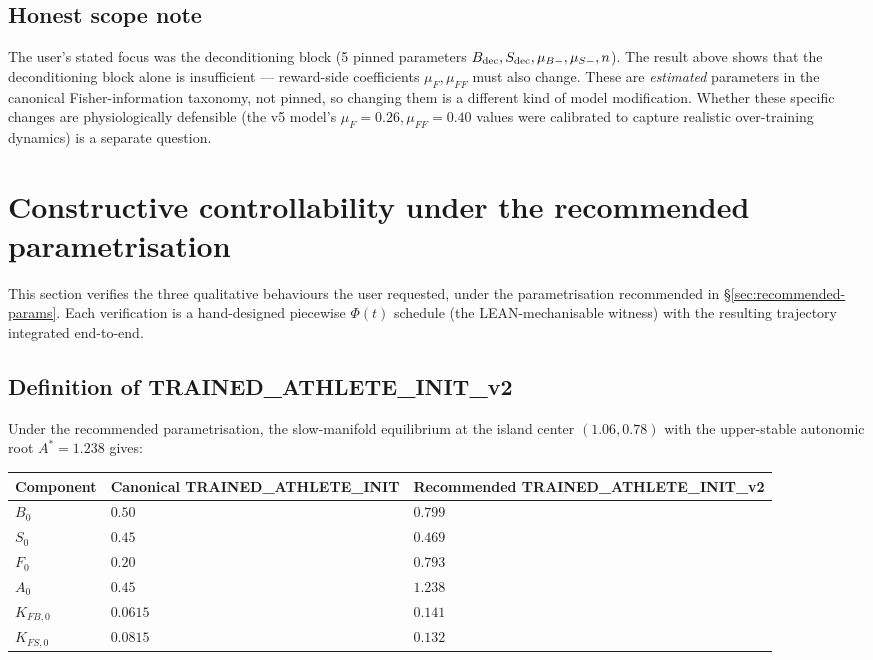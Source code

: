 \documentclass[11pt,a4paper]{article}
\theoremstyle{definition}
\begin{document}
\subsection{Honest scope note}

The user's stated focus was the deconditioning block (5 pinned parameters $B_{\rm dec}, S_{\rm dec}, \mu_{B-}, \mu_{S-}, n$). The result above shows that the deconditioning block alone is insufficient — reward-side coefficients $\mu_F, \mu_{FF}$ must also change. These are \emph{estimated} parameters in the canonical Fisher-information taxonomy, not pinned, so changing them is a different kind of model modification. Whether these specific changes are physiologically defensible (the v5 model's $\mu_F = 0.26, \mu_{FF} = 0.40$ values were calibrated to capture realistic over-training dynamics) is a separate question.

\section{Constructive controllability under the recommended parametrisation} \label{sec:constructive-v2}

This section verifies the three qualitative behaviours the user requested, under the parametrisation recommended in §\ref{sec:recommended-params}. Each verification is a hand-designed piecewise $\Phi(t)$ schedule (the LEAN-mechanisable witness) with the resulting trajectory integrated end-to-end.

\subsection{Definition of TRAINED\_ATHLETE\_INIT\_v2}

Under the recommended parametrisation, the slow-manifold equilibrium at the island center $(1.06, 0.78)$ with the upper-stable autonomic root $A^* = 1.238$ gives:

\begin{center}\small
\begin{tabular}{lll}
\toprule
Component & Canonical TRAINED\_ATHLETE\_INIT & Recommended TRAINED\_ATHLETE\_INIT\_v2 \\
\midrule
$B_0$       & $0.50$ & $0.799$ \\
$S_0$       & $0.45$ & $0.469$ \\
$F_0$       & $0.20$ & $0.793$ \\
$A_0$       & $0.45$ & $1.238$ \\
$K_{FB,0}$  & $0.0615$ & $0.141$ \\
$K_{FS,0}$  & $0.0815$ & $0.132$ \\
\bottomrule
\end{tabular}
\end{center}
\end{document}
